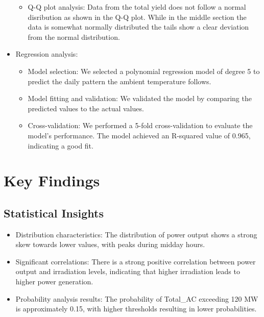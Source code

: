 \documentclass[10pt]{article}
\begin{document}
\begin{itemize}
    \begin{itemize}
        \item Q-Q plot analysis: Data from the total yield does not follow a normal disribution as shown in the Q-Q plot. While in the middle section the data is somewhat normally distributed the tails show a clear deviation from the normal distribution.
    \end{itemize}
    \item Regression analysis:
    \begin{itemize}
        \item Model selection: We selected a polynomial regression model of degree 5 to predict the daily pattern the ambient temperature follows.
        \item Model fitting and validation: We validated the model by comparing the predicted values to the actual values.
        \item Cross-validation: We performed a 5-fold cross-validation to evaluate the model's performance. The model achieved an R-squared value of 0.965, indicating a good fit.
    \end{itemize}
\end{itemize}

\section{Key Findings}

\subsection{Statistical Insights}
\begin{itemize}
    \item Distribution characteristics: The distribution of power output shows a strong skew towards lower values, with peaks during midday hours.
    \item Significant correlations: There is a strong positive correlation between power output and irradiation levels, indicating that higher irradiation leads to higher power generation.
    \item Probability analysis results: The probability of Total\_AC exceeding 120 MW is approximately 0.15, with higher thresholds resulting in lower probabilities.
\end{itemize}
\end{document}
